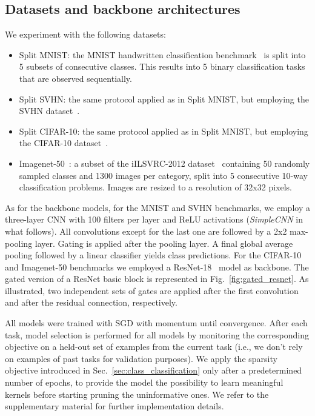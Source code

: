 \documentclass[10pt,twocolumn,letterpaper]{article}
\begin{document}
\subsection{Datasets and backbone architectures}
\label{sec:datasets}
We experiment with the following datasets:
\begin{itemize}[noitemsep]
    \item Split MNIST: the MNIST handwritten classification benchmark~\cite{mnist} is split into 5 subsets of consecutive classes. This results into 5 binary classification tasks that are observed sequentially.
    \item Split SVHN: the same protocol applied as in Split MNIST, but employing the SVHN dataset~\cite{svhn}.
    \item Split CIFAR-10: the same protocol applied as in Split MNIST, but employing the CIFAR-10 dataset~\cite{cifar}.
    \item Imagenet-50~\cite{ostapenko2019learning}: a subset of the iILSVRC-2012 dataset~\cite{imagenet} containing 50 randomly sampled classes and 1300 images per category, split into 5 consecutive 10-way classification problems. Images are resized to a resolution of 32x32 pixels.
\end{itemize}
As for the backbone models, for the MNIST and SVHN benchmarks, we employ a three-layer CNN with 100 filters per layer and ReLU activations (\textit{SimpleCNN} in what follows). All convolutions except for the last one are followed by a 2x2 max-pooling layer. Gating is applied after the pooling layer. A final global average pooling followed by a linear classifier yields class predictions. For the \mbox{CIFAR-10} and Imagenet-50 benchmarks we employed a ResNet-18~\cite{resnet} model as backbone. The gated version of a ResNet basic block is represented in Fig.~\ref{fig:gated_resnet}. As illustrated, two independent sets of gates are applied after the first convolution and after the residual connection, respectively.

All models were trained with SGD with momentum until convergence. After each task, model selection is performed for all models by monitoring the corresponding objective on a held-out set of examples from the current task (i.e., we don't rely on examples of past tasks for validation purposes). 
We apply the sparsity objective introduced in Sec.~\ref{sec:class_classification} only after a predetermined number of epochs, to provide the model the possibility to learn meaningful kernels before starting pruning the uninformative ones.
We refer to the supplementary material for further implementation details.
\end{document}
